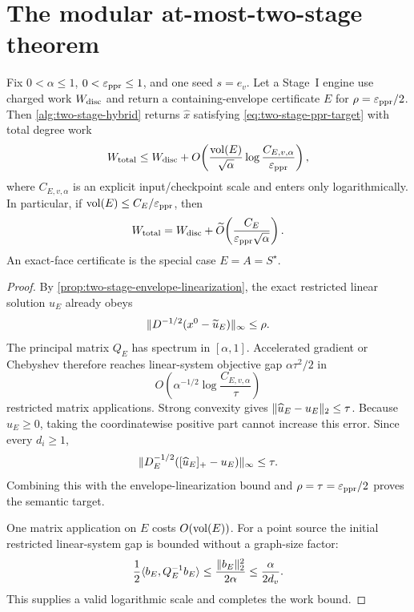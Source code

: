 \section{The modular at-most-two-stage theorem}
\label{sec:two-stage-composition}

\begin{theorem}
\label{thm:two-stage-composition}
Fix $0<\alpha\leq1$, $0<\varepsilon_{\mathrm{ppr}}\leq1$, and one seed $s=e_v$.  Let a Stage~I
engine use charged work $W_{\rm disc}$ and return a containing-envelope
certificate $E$ for $\rho=\varepsilon_{\mathrm{ppr}}/2$.  Then
\cref{alg:two-stage-hybrid} returns $\widehat x$ satisfying
\cref{eq:two-stage-ppr-target} with total degree work
\begin{equation}
 W_{\rm total}
 \leq W_{\rm disc}
 +O\!\left(
   \frac{\operatorname{vol}(E)}{\sqrt\alpha}
   \log\frac{C_{E,v,\alpha}}{\varepsilon_{\mathrm{ppr}}}
 \right),
 \label{eq:two-stage-composition-work}
\end{equation}
where $C_{E,v,\alpha}$ is an explicit input/checkpoint scale and enters only
logarithmically.  In particular, if
$\operatorname{vol}(E)\leq C_E/\varepsilon_{\mathrm{ppr}}$, then
\begin{equation}
 W_{\rm total}
 =W_{\rm disc}
 +\widetilde O\!\left(
   \frac{C_E}{\varepsilon_{\mathrm{ppr}}\sqrt\alpha}
 \right).
 \label{eq:two-stage-product-tail}
\end{equation}
An exact-face certificate is the special case $E=A=S^\star$.
\end{theorem}

\begin{proof}
By \cref{prop:two-stage-envelope-linearization}, the exact restricted linear
solution $u_E$ already obeys
\begin{equation*}
 \lVert D^{-1/2}(x^0-\widetilde u_E)\rVert_\infty\leq\rho.
\end{equation*}
The principal matrix $Q_E$ has spectrum in $[\alpha,1]$.  Accelerated
gradient or Chebyshev therefore reaches linear-system objective gap
$\alpha\tau^2/2$ in
\begin{equation*}
 O\!\left(\alpha^{-1/2}
   \log\frac{C_{E,v,\alpha}}\tau\right)
\end{equation*}
restricted matrix applications.  Strong convexity gives
$\lVert\widehat u_E-u_E\rVert_2\leq\tau$.  Because $u_E\geq0$, taking the
coordinatewise positive part cannot increase this error.  Since every
$d_i\geq1$,
\begin{equation*}
 \lVert D_E^{-1/2}([\widehat u_E]_+-u_E)\rVert_\infty\leq\tau.
\end{equation*}
Combining this with the envelope-linearization bound and
$\rho=\tau=\varepsilon_{\mathrm{ppr}}/2$ proves the semantic target.

One matrix application on $E$ costs $O(\operatorname{vol}(E))$.  For a point source the
initial restricted linear-system gap is bounded without a graph-size factor:
\begin{equation*}
 \frac12\langle b_E,Q_E^{-1}b_E\rangle
 \leq\frac{\lVert b_E\rVert_2^2}{2\alpha}
 \leq\frac{\alpha}{2d_v}.
\end{equation*}
This supplies a valid logarithmic scale and completes the work bound.
\end{proof}

